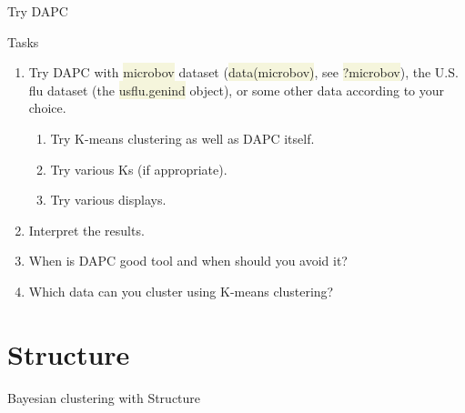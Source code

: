 \documentclass[compress, ucs, xelatex, 11pt, xcolor=svgnames, aspectratio=169,
	hyperref={
		bookmarks=true,
		unicode=true,
		colorlinks=true,
		pdftitle={Molecular data in R},
		plainpages=false,
		pdfauthor={Vojtech Zeisek},
		pdfsubject={Course about phylogeny and evolution in R},
		pdfcreator={XeLaTeX},
		pdfkeywords={R, evolution, phylogeny, molecular data},
		linkcolor=Crimson, %
		anchorcolor=Magenta, %
		citecolor=Magenta, %
		filecolor=Magenta, %
		menucolor=Magenta, %
		urlcolor=DodgerBlue, %
		pdftex},
	url={hyphens, lowtilde} %
	]{beamer}
\renewcommand{\texttt}[1]{\colorbox{Beige}{{\ttfamily #1}}}
\begin{document}
\begin{frame}{Try DAPC}
	\begin{exampleblock}{Tasks}
		\begin{enumerate}
			\item Try DAPC with \texttt{microbov} dataset (\texttt{data(microbov)}, see \texttt{?microbov}), the U.S. flu dataset (the \texttt{usflu.genind} object), or some other data according to your choice.
			\begin{enumerate}
				\item Try K-means clustering as well as DAPC itself.
				\item Try various Ks (if appropriate).
				\item Try various displays.
			\end{enumerate}
			\item Interpret the results.
			\item When is DAPC good tool and when should you avoid it?
			\item Which data can you cluster using K-means clustering?
		\end{enumerate}
	\end{exampleblock}
\end{frame}

\section{Structure}

\begin{frame}{Bayesian clustering with Structure}
	\tableofcontents[currentsection, sectionstyle=show/hide, hideothersubsections]
\end{frame}
\end{document}
